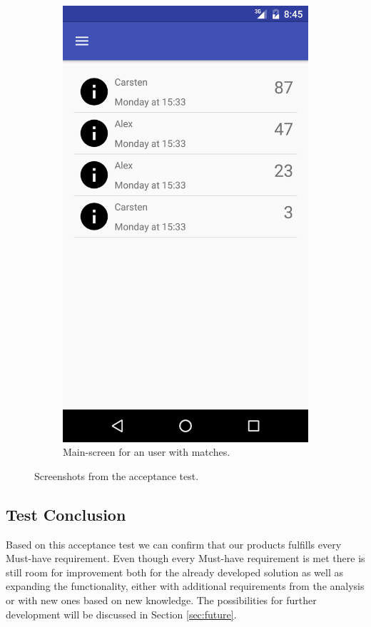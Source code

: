 \begin{figure}[ht!]
\begin{subfigure}[b]{0.24\textwidth}
        \includegraphics[width=\textwidth]{figures/s4test/testmain.png}
        \caption{Main-screen for an user with matches.}
        \label{s4tp:testmain}
\end{subfigure}
\caption{Screenshots from the acceptance test.}
\end{figure}

\subsection{Test Conclusion}
Based on this acceptance test we can confirm that our products fulfills every Must-have requirement.
Even though every Must-have requirement is met there is still room for improvement both for the already developed solution as well as expanding the functionality, either with additional requirements from the analysis or with new ones based on new knowledge. 
The possibilities for further development will be discussed in Section \ref{sec:future}.

